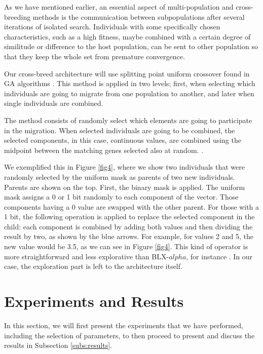 \documentclass[runningheads]{llncs}
\begin{document}
As we have mentioned earlier, an essential aspect of multi-population
and cross-breeding methods is the communication between subpopulations 
after several iterations of isolated
search. Individuals with some specifically chosen characteristics,
such as a high fitness, maybe combined with a certain degree of
similitude or difference to the host population, can be sent to other
population so that they keep the whole set from premature
convergence.

Our cross-breed architecture will use splitting point uniform crossover found in GA
algorithms \cite{Kramer2014}. %
This method is applied in two levels; first, when selecting which
individuals are going to migrate from one population to another, and later when
single individuals are combined. 

The method consists of randomly select which elements 
are going to participate in the migration. When selected individuals are going to be
combined, the selected components, in this case, continuous values, are combined
using the midpoint between the matching genes selected also at random.
\cite{Kramer2017,Kaya2011}.

We exemplified this in Figure \ref{fig4}, where we show two individuals that
were randomly selected by the uniform mask as parents of two new individuals.
Parents are shown on the top. First, the binary mask is applied. The uniform
mask assigns a 0 or 1 bit randomly to each component of the vector. Those
components having a 0 value are swapped with the other parent. For those with a
1 bit, the following operation is applied to replace the selected component in
the child: each component is combined by adding both values and then dividing
the result by two, as shown by the blue arrows. For example, for values 2 and 5,
the new value would be 3.5, as we can see in Figure \ref{fig4}. This kind of
operator is more straightforward and less explorative than BLX-$alpha$, for
instance \cite{picek2013recombination}. In our case, the exploration part is
left to the architecture itself.

\section{Experiments and Results}
  \label{sec:exp}

  In this section, we will first present the experiments that we have performed,
  including the selection of parameters, to then proceed to present and discuss
  the results in Subsection \ref{subs:results}. 
    
\end{document}
